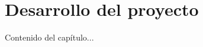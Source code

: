 \documentclass[../main.tex]{subfiles}
\begin{document}
\chapter{Desarrollo del proyecto}
\label{C:desarrollo}

Contenido del capítulo...
\end{document}
